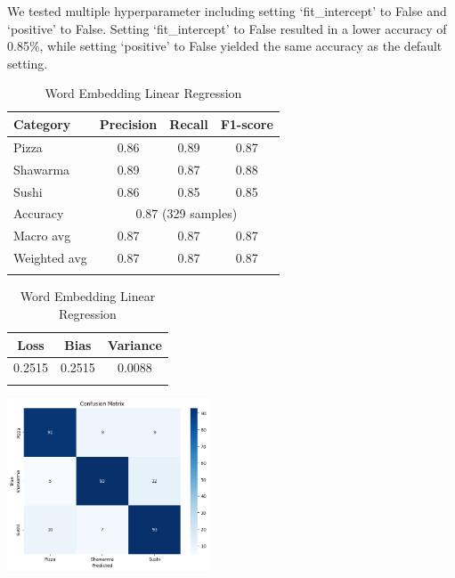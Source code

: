 \begin{itemize}
We tested multiple hyperparameter including setting `fit\_intercept' to False and `positive' to False. Setting `fit\_intercept' to False resulted in a lower accuracy of 0.85\%, while setting `positive' to False yielded the same accuracy as the default setting.

\begin{table}[h]
    \centering
    \begin{tabular}{lccc}
        \hline
        Category     & Precision                              & Recall & F1-score \\
        \hline
        Pizza        & 0.86                                   & 0.89   & 0.87     \\
        Shawarma     & 0.89                                   & 0.87   & 0.88     \\
        Sushi        & 0.86                                   & 0.85   & 0.85     \\
        \hline
        Accuracy     & \multicolumn{3}{c}{0.87 (329 samples)}                     \\
        Macro avg    & 0.87                                   & 0.87   & 0.87     \\
        Weighted avg & 0.87                                   & 0.87   & 0.87     \\
        \hline                                                                    \\
    \end{tabular}
    \begin{tabular}{ccc}
        \hline
        Loss   & Bias   & Variance \\
        \hline
        0.2515 & 0.2515 & 0.0088   \\
        \hline                     \\
    \end{tabular}
    \includegraphics[width=0.45\textwidth]{model/linearregression_confusion.png}
    \caption{Word Embedding Linear Regression}
\end{table}


\end{itemize}
